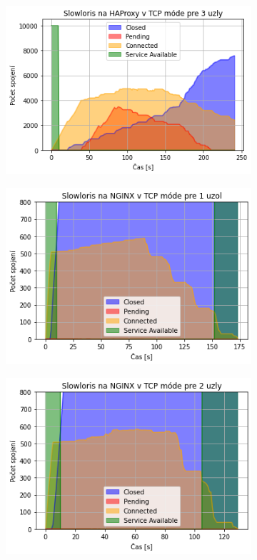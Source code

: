 \documentclass[12pt, a4paper]{article}
\begin{document}
\begin{figure}[h]
\begin{subfigure}[t]{.32\textwidth}
	\end{subfigure}
	\begin{subfigure}[t]{.32\textwidth}
  		\centering
  		\includegraphics[width=\textwidth]{images/haproxy-3-tcp.png}
	\end{subfigure}
	\begin{subfigure}[t]{.32\textwidth}
  		\centering
  		\includegraphics[width=\textwidth]{images/nginx-1-tcp.png}
	\end{subfigure}
	\begin{subfigure}[t]{.32\textwidth}
  		\centering
  		\includegraphics[width=\textwidth]{images/nginx-2-tcp.png}

\end{subfigure}
\end{figure}
\end{document}
